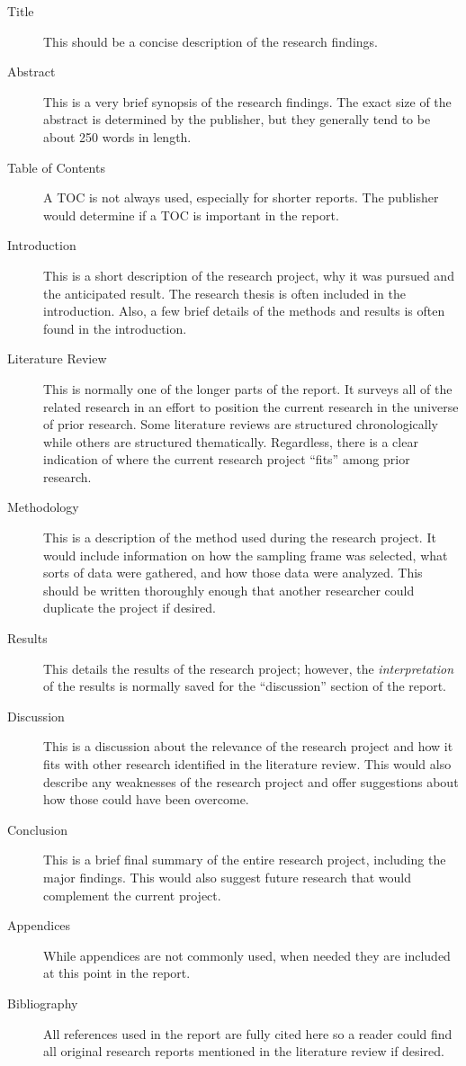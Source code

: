\begin{description}
	\item[Title] This should be a concise description of the research findings.
	\item[Abstract] This is a very brief synopsis of the research findings. The exact size of the abstract is determined by the publisher, but they generally tend to be about 250 words in length.
	\item[Table of Contents] A TOC is not always used, especially for shorter reports. The publisher would determine if a TOC is important in the report.
	\item[Introduction]	This is a short description of the research project, why it was pursued and the anticipated result. The research thesis is often included in the introduction. Also, a few brief details of the methods and results is often found in the introduction.
	\item[Literature Review] This is normally one of the longer parts of the report. It surveys all of the related research in an effort to position the current research in the universe of prior research. Some literature reviews are structured chronologically while others are structured thematically. Regardless, there is a clear indication of where the current research project ``fits'' among prior research.
	\item[Methodology] This is a description of the method used during the research project. It would include information on how the sampling frame was selected, what sorts of data were gathered, and how those data were analyzed. This should be written thoroughly enough that another researcher could duplicate the project if desired.
	\item[Results] This details the results of the research project; however, the \textit{interpretation} of the results is normally saved for the ``discussion'' section of the report.
	\item[Discussion] This is a discussion about the relevance of the research project and how it fits with other research identified in the literature review. This would also describe any weaknesses of the research project and offer suggestions about how those could have been overcome.
	\item[Conclusion] This is a brief final summary of the entire research project, including the major findings. This would also suggest future research that would complement the current project.
	\item[Appendices] While appendices are not commonly used, when needed they are included at this point in the report.
	\item[Bibliography] All references used in the report are fully cited here so a reader could find all original research reports mentioned in the literature review if desired.
\end{description}

